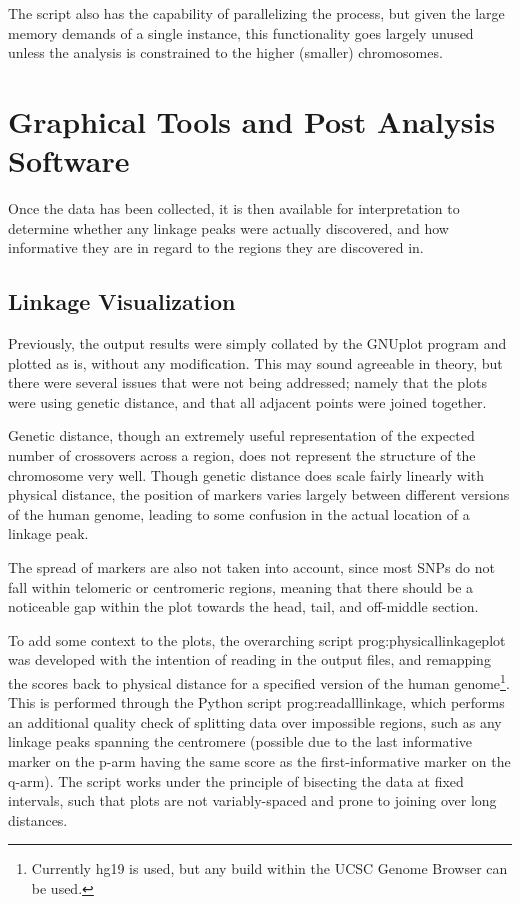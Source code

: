 The script also has the capability of parallelizing the process, but given the large memory demands of a single instance, this functionality goes largely unused unless the analysis is constrained to the higher (smaller) chromosomes. 


\section{Graphical Tools and Post Analysis Software}

Once the data has been collected, it is then available for interpretation to determine whether any linkage peaks were actually discovered, and how informative they are in regard to the regions they are discovered in.

\subsection{Linkage Visualization}

Previously, the output results were simply collated by the GNUplot program and plotted as is, without any modification. This may sound agreeable in theory, but there were several issues that were not being addressed; namely that the plots were using genetic distance, and that all adjacent points were joined together.

Genetic distance, though an extremely  useful representation of the expected number of crossovers across a region, does not represent the structure of the chromosome very well. Though genetic distance does scale fairly linearly with physical distance, the position of markers varies largely between different versions of the human genome, leading to some confusion in the actual location of a linkage peak.

The spread of markers are also not taken into account, since most SNPs do not fall within telomeric or centromeric regions, meaning that there should be a noticeable gap within the plot towards the head, tail, and off-middle section.

To add some context to the plots, the overarching script \gls{prog:physicallinkageplot} was developed with the intention of reading in the output files, and remapping the scores back to physical distance for a specified version of the human genome\footnote{Currently hg19 is used, but any build within the UCSC Genome Browser can be used.}. This is performed through the Python script \gls{prog:readalllinkage}, which performs an additional quality check of splitting data over impossible regions, such as any linkage peaks spanning the centromere (possible due to the last informative marker on the p-arm having the same score as the first-informative marker on the q-arm). The script works under the principle of bisecting the data at fixed intervals, such that plots are not variably-spaced and prone to joining over long distances.

